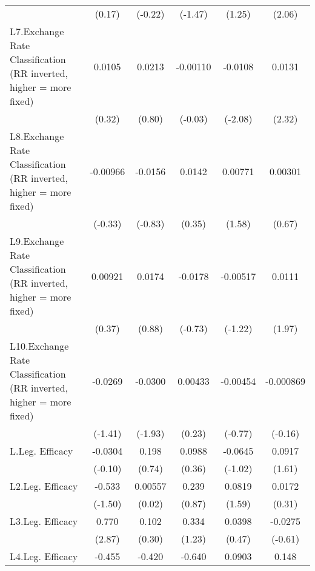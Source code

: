 {\begin{longtable}{l*{5}{c}}
                &   (0.17)         &  (-0.22)         &  (-1.47)         &   (1.25)         &   (2.06)         \\
[1em]
L7.Exchange Rate Classification (RR inverted, higher = more fixed)&   0.0105         &   0.0213         & -0.00110         &  -0.0108\sym{*}  &   0.0131\sym{*}  \\
                &   (0.32)         &   (0.80)         &  (-0.03)         &  (-2.08)         &   (2.32)         \\
[1em]
L8.Exchange Rate Classification (RR inverted, higher = more fixed)& -0.00966         &  -0.0156         &   0.0142         &  0.00771         &  0.00301         \\
                &  (-0.33)         &  (-0.83)         &   (0.35)         &   (1.58)         &   (0.67)         \\
[1em]
L9.Exchange Rate Classification (RR inverted, higher = more fixed)&  0.00921         &   0.0174         &  -0.0178         & -0.00517         &   0.0111         \\
                &   (0.37)         &   (0.88)         &  (-0.73)         &  (-1.22)         &   (1.97)         \\
[1em]
L10.Exchange Rate Classification (RR inverted, higher = more fixed)&  -0.0269         &  -0.0300         &  0.00433         & -0.00454         &-0.000869         \\
                &  (-1.41)         &  (-1.93)         &   (0.23)         &  (-0.77)         &  (-0.16)         \\
[1em]
L.Leg. Efficacy &  -0.0304         &    0.198         &   0.0988         &  -0.0645         &   0.0917         \\
                &  (-0.10)         &   (0.74)         &   (0.36)         &  (-1.02)         &   (1.61)         \\
[1em]
L2.Leg. Efficacy&   -0.533         &  0.00557         &    0.239         &   0.0819         &   0.0172         \\
                &  (-1.50)         &   (0.02)         &   (0.87)         &   (1.59)         &   (0.31)         \\
[1em]
L3.Leg. Efficacy&    0.770\sym{**} &    0.102         &    0.334         &   0.0398         &  -0.0275         \\
                &   (2.87)         &   (0.30)         &   (1.23)         &   (0.47)         &  (-0.61)         \\
[1em]
L4.Leg. Efficacy&   -0.455         &   -0.420         &   -0.640         &   0.0903         &    0.148\sym{*}  \\

\end{longtable}}
